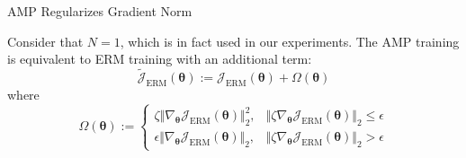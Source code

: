 \begin{frame}{AMP Regularizes Gradient Norm}

\begin{theorem}[informal]
Consider that $N=1$, which is in fact used in our experiments. The AMP training is equivalent to ERM training with an additional term:
\begin{equation}
\widetilde{\mathcal{J}}_\mathrm{ERM}(\boldsymbol{\theta}):=\mathcal{J}_\mathrm{ERM}(\boldsymbol{\theta})+\Omega(\boldsymbol{\theta})
\end{equation}
where
\begin{equation}
\Omega(\boldsymbol{\theta}):=\begin{cases}
\zeta\Vert\nabla_{\boldsymbol{\theta}}\mathcal{J}_\mathrm{ERM}(\boldsymbol{\theta})\Vert_2^2,&\Vert\zeta\nabla_{\boldsymbol{\theta}}\mathcal{J}_\mathrm{ERM}(\boldsymbol{\theta})\Vert_2\le\epsilon\\
\epsilon\Vert\nabla_{\boldsymbol{\theta}}\mathcal{J}_\mathrm{ERM}(\boldsymbol{\theta})\Vert_2,&\Vert\zeta\nabla_{\boldsymbol{\theta}}\mathcal{J}_\mathrm{ERM}(\boldsymbol{\theta})\Vert_2>\epsilon
\end{cases}
\end{equation}
\end{theorem}


\end{frame}
